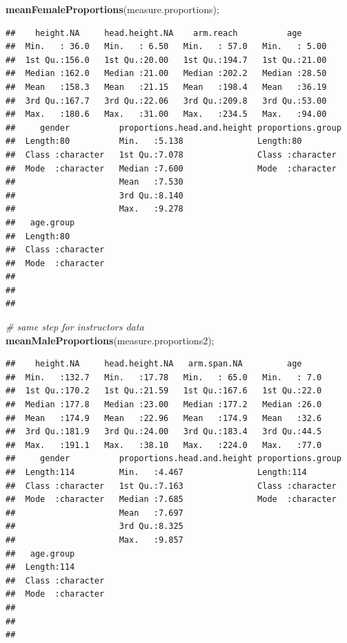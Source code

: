 \documentclass[]{article}
\newenvironment{Shaded}{\begin{snugshade}}{\end{snugshade}}
\newcommand{\CommentTok}[1]{\textcolor[rgb]{0.56,0.35,0.01}{\textit{#1}}}
\newcommand{\KeywordTok}[1]{\textcolor[rgb]{0.13,0.29,0.53}{\textbf{#1}}}
\newcommand{\NormalTok}[1]{#1}
\begin{document}
\begin{Shaded}
\begin{Highlighting}[]
\KeywordTok{meanFemaleProportions}\NormalTok{(measure.proportions);}
\end{Highlighting}
\end{Shaded}

\begin{verbatim}
##    height.NA     head.height.NA    arm.reach          age       
##  Min.   : 36.0   Min.   : 6.50   Min.   : 57.0   Min.   : 5.00  
##  1st Qu.:156.0   1st Qu.:20.00   1st Qu.:194.7   1st Qu.:21.00  
##  Median :162.0   Median :21.00   Median :202.2   Median :28.50  
##  Mean   :158.3   Mean   :21.15   Mean   :198.4   Mean   :36.19  
##  3rd Qu.:167.7   3rd Qu.:22.06   3rd Qu.:209.8   3rd Qu.:53.00  
##  Max.   :180.6   Max.   :31.00   Max.   :234.5   Max.   :94.00  
##     gender          proportions.head.and.height proportions.group 
##  Length:80          Min.   :5.138               Length:80         
##  Class :character   1st Qu.:7.078               Class :character  
##  Mode  :character   Median :7.600               Mode  :character  
##                     Mean   :7.530                                 
##                     3rd Qu.:8.140                                 
##                     Max.   :9.278                                 
##   age.group        
##  Length:80         
##  Class :character  
##  Mode  :character  
##                    
##                    
## 
\end{verbatim}

\begin{Shaded}
\begin{Highlighting}[]
\CommentTok{\# same step for instructors data}
\KeywordTok{meanMaleProportions}\NormalTok{(measure.proportions2);}
\end{Highlighting}
\end{Shaded}

\begin{verbatim}
##    height.NA     head.height.NA   arm.span.NA         age      
##  Min.   :132.7   Min.   :17.78   Min.   : 65.0   Min.   : 7.0  
##  1st Qu.:170.2   1st Qu.:21.59   1st Qu.:167.6   1st Qu.:22.0  
##  Median :177.8   Median :23.00   Median :177.2   Median :26.0  
##  Mean   :174.9   Mean   :22.96   Mean   :174.9   Mean   :32.6  
##  3rd Qu.:181.9   3rd Qu.:24.00   3rd Qu.:183.4   3rd Qu.:44.5  
##  Max.   :191.1   Max.   :38.10   Max.   :224.0   Max.   :77.0  
##     gender          proportions.head.and.height proportions.group 
##  Length:114         Min.   :4.467               Length:114        
##  Class :character   1st Qu.:7.163               Class :character  
##  Mode  :character   Median :7.685               Mode  :character  
##                     Mean   :7.697                                 
##                     3rd Qu.:8.325                                 
##                     Max.   :9.857                                 
##   age.group        
##  Length:114        
##  Class :character  
##  Mode  :character  
##                    
##                    
## 
\end{verbatim}
\end{document}
